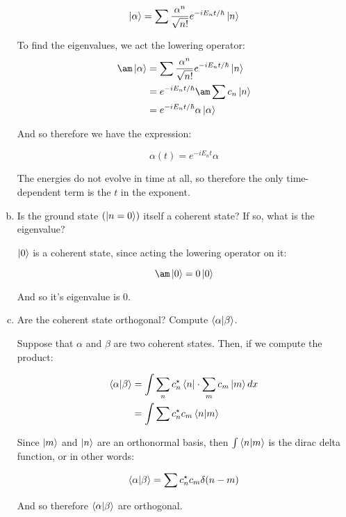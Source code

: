\documentclass[10pt]{article}
\begin{document}
\begin{enumerate}[(a)]
\begin{solution}
            \[ \ket \alpha = \sum \frac{\alpha^n}{\sqrt{n!}} e^{-iE_nt/\hbar} \ket n\]

            To find the eigenvalues, we act the lowering operator: 
            \begin{align*}
                \am \ket \alpha &= \sum \frac{\alpha^n}{\sqrt{n!}} e^{-iE_nt/\hbar} \ket n\\
                &= e^{-iE_nt/\hbar}  \am \sum c_n \ket n\\
                &= e^{-iE_nt/\hbar}\alpha \ket \alpha
            \end{align*}

            And so therefore we have the expression: 

            \[ \alpha(t) = e^{-iE_nt}\alpha\] 

            The energies do not evolve in time at all, so therefore the only time-dependent term is the $t$ in the exponent.



        \end{solution}
        \item Is the ground state $(\ket {n = 0})$ itself a coherent state? If so, what is the eigenvalue?

        \begin{solution}
            $\ket 0$ is a coherent state, since acting the lowering operator on it: 

            \[ \am \ket 0 = 0 \ket 0\] 

            And so it's eigenvalue is 0. 
        \end{solution}
        \item Are the coherent state orthogonal? Compute $\braket{\alpha}{\beta}$. 
        
        \begin{solution}
            Suppose that $\alpha$ and $\beta$ are two coherent states. Then, if we compute the product: 

            \begin{align*}
                \braket{\alpha}{\beta} &= \int \sum_{n} c_n^\star \bra{n} \cdot \sum_m c_m \ket m dx\\
                &= \int \sum c_n^\star c_m \braket{n}{m}
            \end{align*}
            
            Since $\ket m$ and $\ket n$ are an orthonormal basis, then $\int \braket{n}{m}$ is the dirac delta function, or in other words: 

            \[ \braket{\alpha}{\beta} = \sum c_n^\star c_m \delta(n - m)\]

            And so therefore $\braket{\alpha}{\beta}$ are orthogonal.
        \end{solution}
    \end{enumerate}
\end{document}
